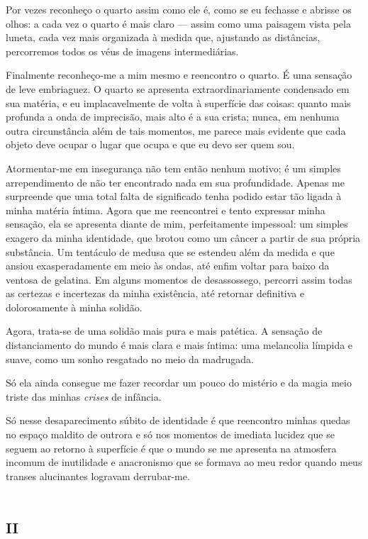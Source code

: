 Por vezes reconheço o quarto assim como ele é, como se eu fechasse e abrisse os olhos: a cada vez o quarto é mais claro --- assim como uma paisagem vista pela luneta, cada vez mais organizada à medida que, ajustando as distâncias, percorremos todos os véus de imagens intermediárias.

Finalmente reconheço-me a mim mesmo e reencontro o quarto. É uma sensação de leve embriaguez. O quarto se apresenta extraordinariamente condensado em sua matéria, e eu implacavelmente de volta à superfície das coisas: quanto mais profunda a onda de imprecisão, mais alto é a sua crista; nunca, em nenhuma outra circunstância além de tais momentos, me parece mais evidente que cada objeto deve ocupar o lugar que ocupa e que eu devo ser quem sou.

Atormentar-me em insegurança não tem então nenhum motivo; é um simples arrependimento de não ter encontrado nada em sua profundidade. Apenas me surpreende que uma total falta de significado tenha podido estar tão ligada à minha matéria íntima. Agora que me reencontrei e tento expressar minha sensação, ela se apresenta diante de mim, perfeitamente impessoal: um simples exagero da minha identidade, que brotou como um câncer a partir de sua própria substância. Um tentáculo de medusa que se estendeu além da medida e que ansiou exasperadamente em meio às ondas, até enfim voltar para baixo da ventosa de gelatina. Em alguns momentos de desassossego, percorri assim todas as certezas e incertezas da minha existência, até retornar definitiva e dolorosamente à minha solidão.

Agora, trata-se de uma solidão mais pura e mais patética. A sensação de distanciamento do mundo é mais clara e mais íntima: uma melancolia límpida e suave, como um sonho resgatado no meio da madrugada.

Só ela ainda consegue me fazer recordar um pouco do mistério e da magia meio triste das minhas \textit{crises} de infância.

Só nesse desaparecimento súbito de identidade é que reencontro minhas quedas no espaço maldito de outrora e só nos momentos de imediata lucidez que se seguem ao retorno à superfície é que o mundo se me apresenta na atmosfera incomum de inutilidade e anacronismo que se formava ao meu redor quando meus transes alucinantes logravam derrubar-me.


\chapter*{\huge\centering\textsc{ii}}


